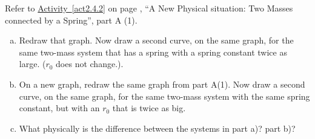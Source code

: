 \label{fnt2.4.2-1}

Refer to \hyperref[act2.4.2]{Activity~\ref*{act2.4.2}} on page \pageref{act2.4.2}, ``A New Physical situation: Two Masses connected by a Spring'', part A (1).

\begin{enumerate}[(a)]
	\item Redraw that graph.  Now draw a second curve, on the same graph, for the same two-mass system that has a spring with a spring constant twice as large.  ($r_0$ does not change.).
	
	\item On a new graph, redraw the same graph from part A(1).  Now draw a second curve, on the same graph, for the same two-mass system with the same spring constant, but with an $r_0$ that is twice as big.
	
	\item What physically is the difference between the systems in part a)? part b)?
\end{enumerate}